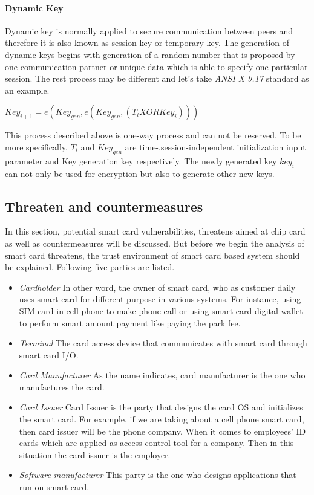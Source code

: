 \paragraph{Dynamic Key}
Dynamic key is normally applied to secure communication between peers and therefore it is also known as session key or temporary key. The generation of dynamic keys begins with generation of a random number that is proposed by one communication partner or unique data which is able to specify one particular session. The rest process may be different and let's take \emph{ANSI X 9.17} standard as an example\cite{handbook}. 
\begin{center}
$Key_{i+1} = e(Key_{gen},e(Key_{gen},(T_{i} XOR Key_{i})))$
\end{center}
This process described above is one-way process and can not be reserved. To be more specifically, $T_{i}$ and  $Key_{gen}$ are time-,session-independent initialization input parameter and Key generation key respectively. The newly generated  key $key_{i}$ can not only be used for encryption but also to generate other new keys.
\subsection{Threaten and countermeasures}
In this section, potential smart card vulnerabilities, threatens aimed at chip card as well as countermeasures will be discussed. But before we begin the analysis of smart card threatens, the trust environment of smart card based system should be explained. Following five parties are listed\cite{smart_card_attack1}.
\begin{itemize}
\item \emph{Cardholder} In other word, the owner of smart card, who as customer daily uses smart card for different purpose  in various systems. For instance, using SIM card in cell phone to make phone call or using smart card digital wallet to perform smart amount payment like paying the park fee.
\item \emph{Terminal} The card access device that communicates with smart card through smart card I/O.
\item \emph{Card Manufacturer} As the name indicates, card manufacturer is the one who manufactures  the card.
\item \emph{Card Issuer} Card Issuer is the party that designs the card OS and initializes the smart card. For example, if we are taking about a cell phone smart card, then card issuer will be the phone company. When it comes to employees' ID cards which are applied as access control tool for a company. Then in this situation the card issuer is the employer.
\item \emph{Software manufacturer} This party is the one who designs applications that run on smart card.
\end{itemize}

